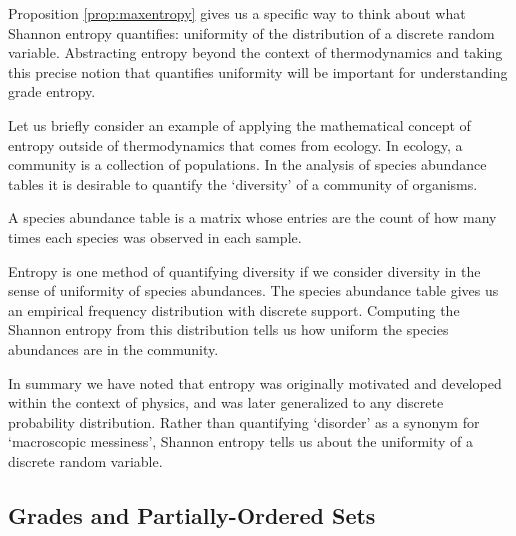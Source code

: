 \documentclass[
  letterpaper,
  DIV=11,
  numbers=noendperiod]{scrreprt}
\begin{document}
Proposition \ref{prop:maxentropy} gives us a specific way to think about
what Shannon entropy quantifies: uniformity of the distribution of a
discrete random variable. Abstracting entropy beyond the context of
thermodynamics and taking this precise notion that quantifies uniformity
will be important for understanding grade entropy.

Let us briefly consider an example of applying the mathematical concept
of entropy outside of thermodynamics that comes from ecology. In
ecology, a community is a collection of populations. In the analysis of
species abundance tables it is desirable to quantify the `diversity' of
a community of organisms.

\begin{tcolorbox}[enhanced jigsaw, colbacktitle=quarto-callout-note-color!10!white, bottomrule=.15mm, left=2mm, arc=.35mm, bottomtitle=1mm, coltitle=black, breakable, rightrule=.15mm, toptitle=1mm, opacityback=0, titlerule=0mm, title=\textcolor{quarto-callout-note-color}{\faInfo}\hspace{0.5em}{What is a species abundance table?}, colframe=quarto-callout-note-color-frame, toprule=.15mm, leftrule=.75mm, opacitybacktitle=0.6, colback=white]

A species abundance table is a matrix whose entries are the count of how
many times each species was observed in each sample.

\end{tcolorbox}

Entropy is one method of quantifying diversity if we consider diversity
in the sense of uniformity of species abundances. The species abundance
table gives us an empirical frequency distribution with discrete
support. Computing the Shannon entropy from this distribution tells us
how uniform the species abundances are in the community.

In summary we have noted that entropy was originally motivated and
developed within the context of physics, and was later generalized to
any discrete probability distribution. Rather than quantifying
`disorder' as a synonym for `macroscopic messiness', Shannon entropy
tells us about the uniformity of a discrete random variable.

\subsection{Grades and Partially-Ordered
Sets}\label{grades-and-partially-ordered-sets}
\end{document}
